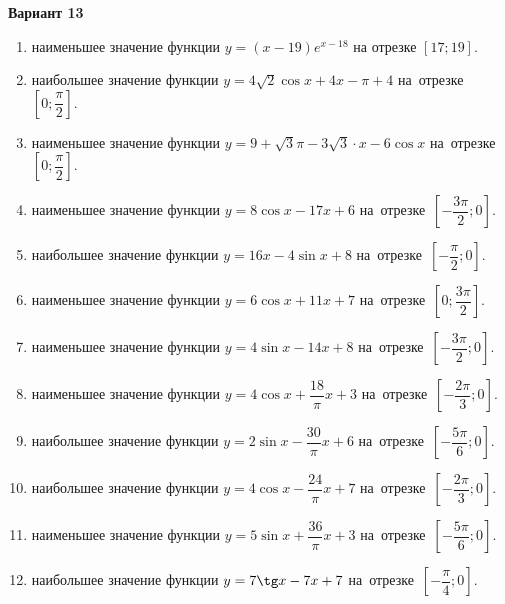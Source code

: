 \documentclass[a4paper,10pt]{article}
\begin{document}
\begin{center}\Large\textbf{Вариант 13}\end{center}

\begin{enumerate}
\item {} наименьшее значение функции $y=\left(x-19\right)e^{x-18}$ на отрезке $\left[17;19\right]$.

\item {} наибольшее значение функции $y=4\sqrt{2}\cos x+4x-\pi +4$ на~отрезке~$\left[0;\dfrac{\pi }{2}\right]$.

\item {} наименьшее значение функции $y=9+\sqrt{3}\pi -3\sqrt{3}\cdot x-6\cos x$ на~отрезке~$\left[0;\dfrac{\pi }{2}\right]$.

\item {} наименьшее значение функции $y=8\cos x-17x+6$ на~отрезке~$\left[-\dfrac{3\pi }{2};0\right]$.

\item {} наибольшее значение функции $y=16x-4\sin x+8$ на~отрезке~$\left[-\dfrac{\pi }{2};0\right]$.

\item {} наименьшее значение функции $y=6\cos x+11x+7$ на~отрезке~$\left[0;\dfrac{3\pi }{2}\right]$.

\item {} наименьшее значение функции $y=4\sin x-14x+8$ на~отрезке~$\left[-\dfrac{3\pi }{2};0\right]$.

\item {} наименьшее значение функции $y=4\cos x+\dfrac{18}{\pi }x+3$ на~отрезке~$\left[-\dfrac{2\pi }{3};0\right]$.

\item {} наибольшее значение функции $y=2\sin x-\dfrac{30}{\pi }x+6$ на~отрезке~$\left[-\dfrac{5\pi }{6};0\right]$.

\item {} наибольшее значение функции $y=4\cos x-\dfrac{24}{\pi }x+7$ на~отрезке~$\left[-\dfrac{2\pi }{3};0\right]$.

\item {} наименьшее значение функции $y=5\sin x+\dfrac{36}{\pi }x+3$ на~отрезке~$\left[-\dfrac{5\pi }{6};0\right]$.

\item {} наибольшее значение функции $y=7\tg x-7x+7$ на~отрезке~$\left[-\dfrac{\pi }{4};0\right]$.


\end{enumerate}
\end{document}
